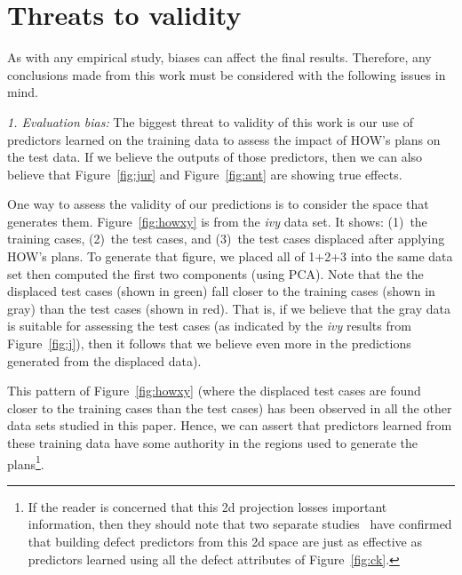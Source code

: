 \documentclass[conference]{IEEEtran}
\newcommand{\fig}[1]{Figure~\ref{fig:#1}}
\begin{document}
\section{Threats to validity}

 

As with any empirical study, biases can affect the final results. Therefore, any
conclusions made from this work must be considered with the following issues in
mind.


{\em 1. Evaluation bias:} The biggest threat to validity of this work is our use
of predictors learned on the training data to assess the impact of HOW's plans
on the test data.
If we believe the outputs of those predictors, then we can also believe that
\fig{jur} and \fig{ant} are showing true effects.  

One way to assess the validity of our predictions is to consider the space that generates
them. \fig{howxy} is from the {\em ivy} data
set. It shows: (1)~the training cases, (2)~the test cases, and (3)~the
test cases displaced after applying HOW's plans.
To generate that figure, we placed all of 1+2+3 into the same data set then computed the first
two  components (using PCA). Note that the  the   displaced test
cases  (shown in green)  fall closer to the training cases (shown in gray) than
the test cases (shown in red).  That is, if we believe
that the gray data is  suitable for assessing
the test cases (as indicated by the {\em ivy} results from \fig{j}), then it follows
that we believe even more in the predictions
generated from the displaced data).

This pattern of \fig{howxy} (where the displaced test cases are found closer to  the training cases than the test cases) has been observed in all the other data sets studied in this
paper. Hence,  we can assert that
predictors learned from these training data have some authority in the regions
used to generate the plans\footnote{If the reader is concerned that this 2d projection
losses important information, then they should note that two separate  studies~\cite{papa13,divya15}
have confirmed that building defect predictors from this 2d space are just as effective
as predictors learned using all the defect attributes of \fig{ck}.}. 
\end{document}
